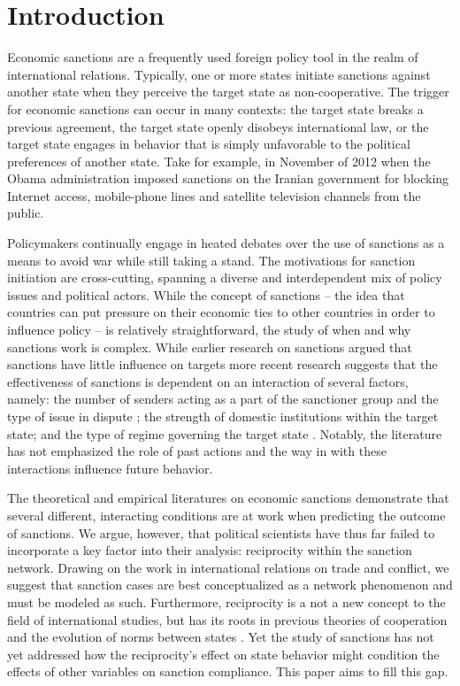 \section*{Introduction}
\label{intro}

Economic sanctions are a frequently used foreign policy tool in the realm of international relations. Typically, one or more states initiate sanctions against another state when they perceive the target state as non-cooperative. The trigger for economic sanctions can occur in many contexts: the target state breaks a previous agreement, the target state openly disobeys international law, or the target state engages in behavior that is simply unfavorable to the political preferences of another state. Take for example, in November of 2012 when the Obama administration imposed sanctions on the Iranian government for blocking Internet access, mobile-phone lines and satellite television channels from the public. 

Policymakers continually engage in heated debates over the use of sanctions as a means to avoid war while still taking a stand. The motivations for sanction initiation are cross-cutting, spanning a diverse and interdependent mix of policy issues and political actors. While the concept of sanctions -- the idea that countries can put pressure on their economic ties to other countries in order to influence policy -- is relatively straightforward, the study of when and why sanctions work is complex. While earlier research on sanctions argued that sanctions have little influence on targets \citep{lam1990, dashti1997, morgan1997, drezner1998} more recent research suggests that the effectiveness of sanctions is dependent on an interaction of several factors, namely: the number of senders acting as a part of the sanctioner group and the type of issue in dispute \citep{miers2002, morgan2009threat}; the strength of domestic institutions within the target state; and the type of regime governing the target state \citep{mcgillivray2004}. Notably, the literature has not emphasized the role of past actions and the way in with these interactions influence future behavior.

The theoretical and empirical literatures on economic sanctions demonstrate that several different, interacting conditions are at work when predicting the outcome of sanctions. We argue, however, that political scientists have thus far failed to incorporate a key factor into their analysis: reciprocity within the sanction network. Drawing on the work in international relations on trade and conflict, we suggest that sanction cases are best conceptualized as a network phenomenon and must be modeled as such. Furthermore, reciprocity is a not a new concept to the field of international studies, but has its roots in previous theories of cooperation and the evolution of norms between states \citep{keohane1989reciprocity,goldstein1991reciprocity,rajmaira1990evolving,ward1992reciprocity}. Yet the study of sanctions has not yet addressed how the reciprocity's effect on state behavior might condition the effects of other variables on sanction compliance. This paper aims to fill this gap.

